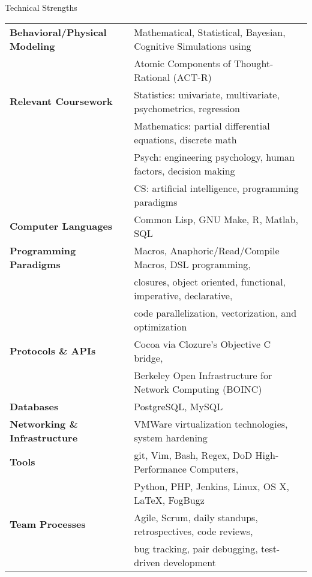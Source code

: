 

\begin{rSection}{Technical Strengths}
  \begin{tabular}{ @{} >{\bfseries}l @{\hspace{4ex}} l }
    Behavioral/Physical Modeling &	Mathematical, Statistical, Bayesian, Cognitive Simulations using \\
    &					Atomic Components of Thought-Rational (ACT-R) \\
    [.1cm]
    Relevant Coursework &		Statistics: univariate, multivariate, psychometrics, regression \\
    &					Mathematics: partial differential equations, discrete math \\
    &					Psych: engineering psychology, human factors, decision making \\ 
    &					CS: artificial intelligence, programming paradigms \\
    [.1cm]
    Computer Languages &		Common Lisp, GNU Make, R, Matlab, SQL \\
    [.1cm]
    Programming Paradigms &		Macros, Anaphoric/Read/Compile Macros, DSL programming, \\
    & 					closures, object oriented, functional, imperative, declarative, \\
    &					code parallelization, vectorization, and optimization \\
    [.1cm]
    Protocols \& APIs & 		Cocoa via Clozure's Objective C bridge, \\
    &					Berkeley Open Infrastructure for Network Computing (BOINC) \\
    [.1cm]
    Databases &				PostgreSQL, MySQL \\
    [.1cm]
    Networking \& Infrastructure &	VMWare virtualization technologies, system hardening \\
    [.1cm]
    Tools & 				git, Vim, Bash, Regex, DoD High-Performance Computers, \\
    &					Python, PHP, Jenkins, Linux, OS X, \LaTeX, FogBugz \\
    [.1cm]
    Team Processes & 			Agile, Scrum, daily standups, retrospectives, code reviews, \\
    & 					bug tracking, pair debugging, test-driven development \\
  \end{tabular}
\end{rSection}

